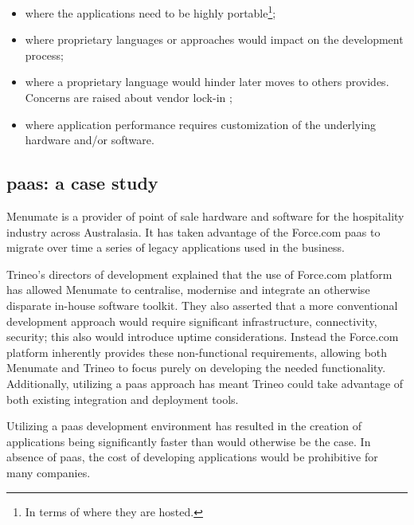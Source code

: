\begin{itemize}
	\item{where the applications need to be highly portable\footnote{In terms of where they are hosted.};}
	\item{where proprietary languages or approaches would impact on the development process;}
	\item{where a proprietary language would hinder later moves to others provides. Concerns are raised
		about vendor lock-in \cite{vendorLockin};}
	\item{where application performance requires customization of the underlying hardware and/or software.}
\end{itemize}

\subsection{\acs{paas}: a case study}
\label{sec:problemSpace-paas-caseStudy}
Menumate \cite{menumateCaseStudy} is a provider of point of sale hardware and software for the hospitality
industry across Australasia. It has taken advantage of the Force.com \ac{paas} to migrate over time a
series of legacy applications used in the business.

Trineo's \cite{trineoCaseStudy} directors of development explained that the use of Force.com platform has
allowed Menumate to centralise, modernise and integrate an otherwise disparate in-house software toolkit. 
They also asserted that a more conventional development approach would require significant infrastructure,
connectivity, security; this also would introduce uptime considerations. Instead the Force.com
platform inherently provides these non-functional requirements, allowing both Menumate and Trineo to
focus purely on developing the needed functionality. Additionally, utilizing a \ac{paas} approach
has meant Trineo could take advantage of both existing integration and deployment tools.

Utilizing a \ac{paas} development environment has resulted in the creation of applications being
significantly faster than would otherwise be the case. In absence of \ac{paas}, the cost of developing
applications would be prohibitive for many companies.